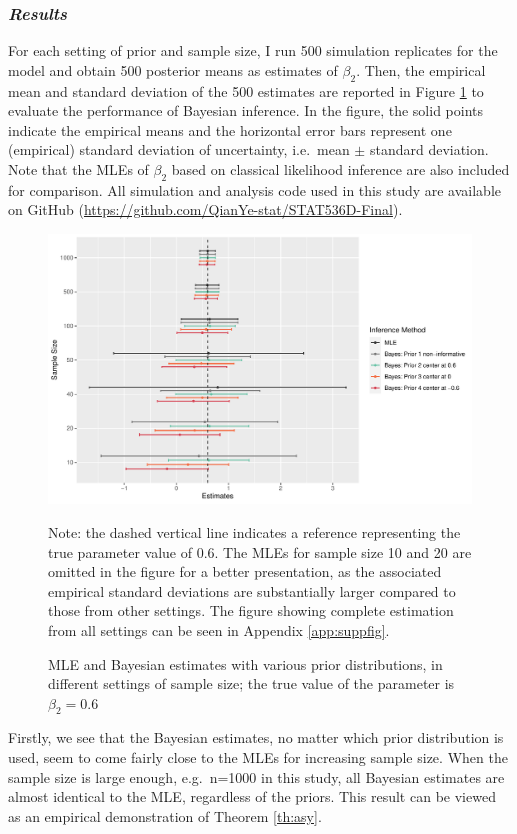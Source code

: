 \documentclass{article}
\numberwithin{equation}{section}
\theoremstyle{plain}
\begin{document}
\subsubsection*{\textit{Results}}
For each setting of prior and sample size, I run 500 simulation replicates for the model and obtain 500 posterior means as estimates of $\beta_2$. Then, the empirical mean and standard deviation of the 500 estimates are reported in Figure \ref{fig:estimate} to evaluate the performance of Bayesian inference. In the figure, the solid points indicate the empirical means and the horizontal error bars represent one (empirical) standard deviation of uncertainty, i.e.\ mean $\pm$ standard deviation. Note that the MLEs of $\beta_2$ based on classical likelihood inference are also included for comparison. All simulation and analysis code used in this study are available on GitHub (\url{https://github.com/QianYe-stat/STAT536D-Final}).
\begin{figure}[H]
    \centering
    \caption{MLE and Bayesian estimates with various prior distributions, in different settings of sample size; the true value of the parameter is $\beta_2=0.6$}
    \includegraphics[scale=0.75]{figures/Estimates.pdf}
    \label{fig:estimate}
    \begin{minipage}{\textwidth} 
{\footnotesize Note: the dashed vertical line indicates a reference representing the true parameter value of 0.6. The MLEs for sample size 10 and 20 are omitted in the figure for a better presentation, as the associated empirical standard deviations are substantially larger compared to those from other settings. The figure showing complete estimation from all settings can be seen in Appendix \ref{app:suppfig}.\par}
\end{minipage}
\end{figure}
Firstly, we see that the Bayesian estimates, no matter which prior distribution is used, seem to come fairly close to the MLEs for increasing sample size. When the sample size is large enough, e.g.\ n=1000 in this study, all Bayesian estimates are almost identical to the MLE, regardless of the priors. This result can be viewed as an empirical demonstration of Theorem \ref{th:asy}. 
\end{document}
